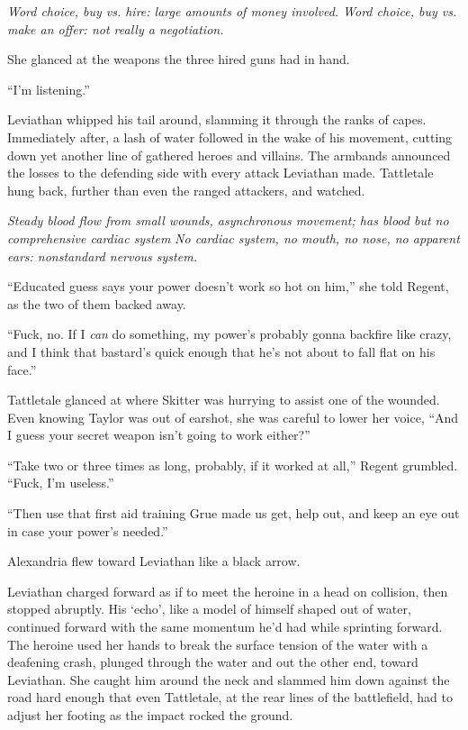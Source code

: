 \emph{Word choice, buy vs. hire: large amounts of money involved. Word choice, buy vs. make an offer: not really a negotiation.}



She glanced at the weapons the three hired guns had in hand.



``I'm listening.''



\sectionbreak



Leviathan whipped his tail around, slamming it through the ranks of capes.  Immediately after, a lash of water followed in the wake of his movement, cutting down yet another line of gathered heroes and villains.  The armbands announced the losses to the defending side with every attack Leviathan made.  Tattletale hung back, further than even the ranged attackers, and watched.



\emph{Steady blood flow from small wounds, asynchronous movement; has blood but no comprehensive cardiac system}\emph{ No cardiac system, no mouth, no nose, no apparent ears: nonstandard nervous system.}



``Educated guess says your power doesn't work so hot on him,'' she told Regent, as the two of them backed away.



``Fuck, no.  If I \emph{can} do something, my power's probably gonna backfire like crazy, and I think that bastard's quick enough that he's not about to fall flat on his face.''



Tattletale glanced at where Skitter was hurrying to assist one of the wounded.  Even knowing Taylor was out of earshot, she was careful to lower her voice, ``And I guess your secret weapon isn't going to work either?''



``Take two or three times as long, probably, if it worked at all,'' Regent grumbled.  ``Fuck, I'm useless.''



``Then use that first aid training Grue made us get, help out, and keep an eye out in case your power's needed.''



Alexandria flew toward Leviathan like a black arrow.



Leviathan charged forward as if to meet the heroine in a head on collision, then stopped abruptly.  His `echo', like a model of himself shaped out of water, continued forward with the same momentum he'd had while sprinting forward.  The heroine used her hands to break the surface tension of the water with a deafening crash, plunged through the water and out the other end, toward Leviathan.  She caught him around the neck and slammed him down against the road hard enough that even Tattletale, at the rear lines of the battlefield, had to adjust her footing as the impact rocked the ground.



